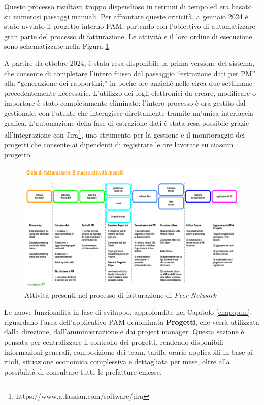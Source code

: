 Questo processo risultava troppo dispendioso in termini di tempo ed era basato su numerosi passaggi manuali. Per affrontare queste criticità, a gennaio 2024
è stato avviato il progetto interno \ac{PAM}, partendo con l’obiettivo di automatizzare gran parte del processo di fatturazione.
Le attività e il loro ordine di esecuzione sono schematizzate nella Figura \ref{fig:fatturazione}.

A partire da ottobre 2024, è stata resa disponibile la prima versione del sistema, che consente di completare l’intero flusso dal passaggio “estrazione dati
per PM” alla “generazione dei rapportini,” in poche ore anziché nelle circa due settimane precedentemente necessarie. L’utilizzo dei fogli elettronici da creare,
modificare o importare è stato completamente eliminato: l’intero processo è ora gestito dal gestionale, con l’utente che interagisce direttamente tramite un’unica
interfaccia grafica. L’automazione della fase di estrazione dati è stata resa possibile grazie all’integrazione con Jira\footnote{https://www.atlassian.com/software/jira},
uno strumento per la gestione e il monitoraggio dei progetti che consente ai dipendenti di registrare le ore lavorate su ciascun progetto.

\begin{figure}
    \centering
    \includegraphics[width=\linewidth]{figures/fasiFatturazionePN.pdf}
    \caption{Attività presenti nel processo di fatturazione di \textit{Peer Network}}
    \label{fig:fatturazione}
\end{figure}

Le nuove funzionalità in fase di sviluppo, approfondite nel Capitolo \ref{chap:pam}, riguardano l’area dell’applicativo \ac{PAM} denominata \textbf{Progetti}, che verrà
utilizzata dalla direzione, dall’amministrazione e dai project manager. Questa sezione è pensata per centralizzare il controllo dei progetti, rendendo disponibili
informazioni generali, composizione dei team, tariffe orarie applicabili in base ai ruoli, situazione economica complessiva e dettagliata per mese, oltre alla
possibilità di consultare tutte le prefatture emesse.

